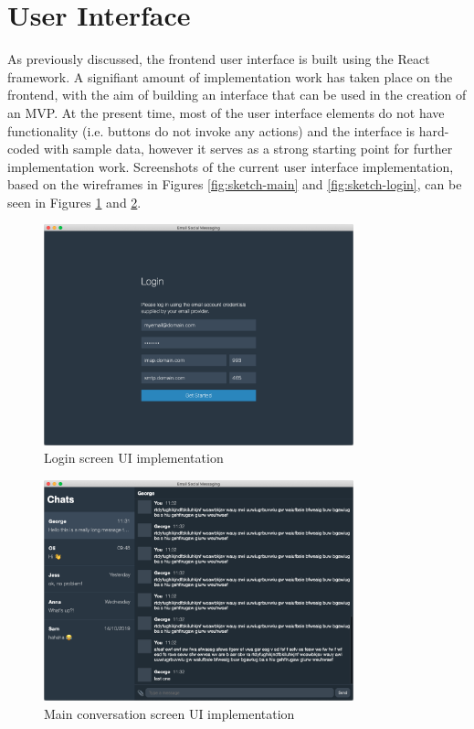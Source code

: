 \section{User Interface}
As previously discussed, the frontend user interface is built using the React framework. A signifiant amount of implementation work has taken place on the frontend, with the aim of building an interface that can be used in the creation of an MVP. At the present time, most of the user interface elements do not have functionality (i.e. buttons do not invoke any actions) and the interface is hard-coded with sample data, however it serves as a strong starting point for further implementation work. Screenshots of the current user interface implementation, based on the wireframes in Figures \ref{fig:sketch-main} and \ref{fig:sketch-login}, can be seen in Figures \ref{fig:main-ui} and \ref{fig:login-ui}.

\begin{figure}[h!]
  \centering
  \includegraphics[width=0.8\textwidth]{images/implementation-login.png}
  \caption{Login screen UI implementation}
  \label{fig:main-ui}
\end{figure}

\begin{figure}[h!]
  \centering
  \includegraphics[width=0.8\textwidth]{images/implementation-main.png}
  \caption{Main conversation screen UI implementation}
  \label{fig:login-ui}
\end{figure}